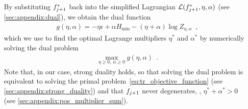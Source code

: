 By substituting $f_{j+1}^{\ast}$ back into the simplified Lagrangian $\mathcal{L}(f_{j+1}^{\ast},\eta,\alpha)$ (see \cref{sec:appendix:dual}), we obtain the dual function
\begingroup
\begin{align}
    \label{eq:tr_dual}
    g(\eta, \alpha) 
    = -\eta \epsilon + \alpha H_{\min} - (\eta + \alpha) \log Z_{\eta,\alpha} \enspace,
\end{align}
\endgroup
which we use to find the optimal Lagrange multipliers $\eta^{\ast}$ and $\alpha^{\ast}$ by numerically solving the dual problem
\begin{align}
    \label{eq:tr_dual:opt_problem}
    \max_{\eta \geq 0, ~\alpha \geq 0} g(\eta, \alpha) \enspace.
\end{align}
Note that, in our case, strong duality holds, so that solving the dual problem is equivalent to solving the primal problem~\cref{eq:tr_objective_function} (see \cref{sec:appendix:strong_duality}) and that $f_{j+1}$ never degenerates, \ie, $\eta^{\ast} + \alpha^{\ast} > 0$ (see \cref{sec:appendix:pos_multiplier_sum}).

